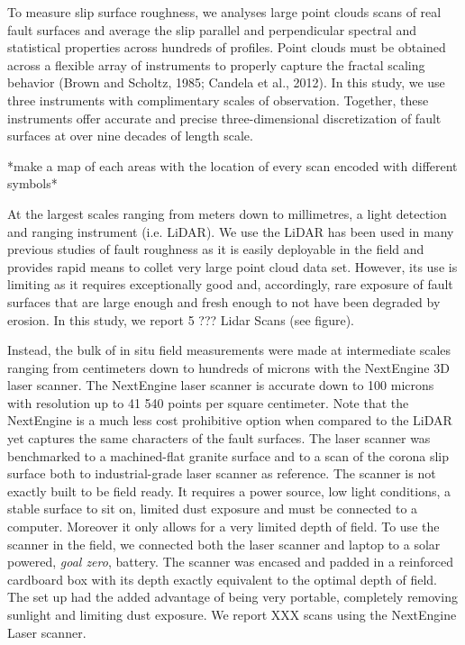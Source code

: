 \documentclass[12pt,a4paper]{article}
\begin{document}
To measure slip surface roughness, we analyses large point clouds scans of real fault surfaces and average the slip parallel and perpendicular spectral and statistical properties across hundreds of profiles. Point clouds must be obtained across a flexible array of instruments to properly capture the fractal scaling behavior (Brown and Scholtz, 1985; Candela et al., 2012). In this study, we use three instruments with complimentary scales of observation.  Together, these instruments offer accurate and precise three-dimensional discretization of fault surfaces at over nine decades of length scale.

*make a map of each areas with the location of every scan encoded with different symbols*

At the largest scales ranging from meters down to millimetres, a light detection and ranging instrument (i.e. LiDAR). We use the  LiDAR has been used in many previous studies of fault roughness as it is easily deployable in the field and provides rapid means to collet very large point cloud data set. However, its use is limiting as it requires exceptionally good and, accordingly, rare exposure of fault surfaces that are large enough and fresh enough to not have been degraded by erosion. In this study, we report 5 ??? Lidar Scans (see figure).

Instead, the bulk of in situ field measurements were made at intermediate scales ranging from centimeters down to hundreds of microns with the NextEngine 3D laser scanner. The NextEngine laser scanner is accurate down to 100 microns with resolution up to 41 540 points per square centimeter. Note that the NextEngine is a much less cost prohibitive option when compared to the LiDAR yet captures the same characters of the fault surfaces. The laser scanner was benchmarked to a machined-flat granite surface and to a scan of the corona slip surface both to industrial-grade laser scanner as reference. The scanner is not exactly built to be field ready. It requires a power source, low light conditions, a stable surface to sit on, limited dust exposure and must be connected to a computer. Moreover it only allows for a very limited depth of field. To use the scanner in the field, we connected both the laser scanner and laptop to a solar powered, \textit{goal zero}, battery. The scanner was encased and padded in a reinforced cardboard box with its depth exactly equivalent to the optimal depth of field. The set up had the added advantage of being very portable, completely removing sunlight and limiting dust exposure. We report XXX scans using the NextEngine Laser scanner.
\end{document}
